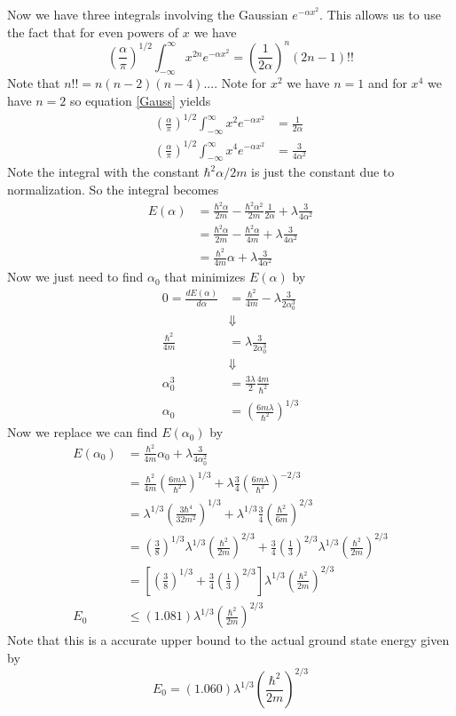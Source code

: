 \documentclass[11pt]{article}
\numberwithin{equation}{section}
\begin{document}
Now we have three integrals involving the Gaussian $e^{-\alpha x^2}$. This allows us to use the fact that for even powers of $x$ we have
\begin{equation} 
\left(\frac{\alpha}{\pi}\right)^{1/2}\int_{-\infty}^{\infty} x^{2n}e^{-\alpha x^2} = \left(\frac{1}{2\alpha}\right)^{n}(2n-1)!!
\label{Gauss}
\end{equation} 
Note that $n!! = n(n-2)(n-4)...$. Note for $x^2$ we have $n=1$ and for $x^4$ we have $n=2$ so equation \ref{Gauss} yields
\begin{align*}
\left(\frac{\alpha}{\pi}\right)^{1/2}\int_{-\infty}^{\infty} x^{2}e^{-\alpha x^2} &= \frac{1}{2\alpha}\\
\left(\frac{\alpha}{\pi}\right)^{1/2}\int_{-\infty}^{\infty} x^{4}e^{-\alpha x^2} &= \frac{3}{4\alpha^2}
\end{align*}
Note the integral with the constant $\hbar^2\alpha/2m$ is just the constant due to normalization. So the integral becomes
\begin{align*}
E(\alpha) &= \frac{\hbar^2\alpha}{2m} - \frac{\hbar^2\alpha^2}{2m}\frac{1}{2\alpha} + \lambda\frac{3}{4\alpha^2}\\
&= \frac{\hbar^2\alpha}{2m} - \frac{\hbar^2\alpha}{4m} + \lambda\frac{3}{4\alpha^2}\\
&= \frac{\hbar^2}{4m}\alpha + \lambda\frac{3}{4\alpha^2}
\end{align*}
Now we just need to find $\alpha_0$ that minimizes $E(\alpha)$ by
\begin{align*}
0 = \frac{dE(\alpha)}{d\alpha} &= \frac{\hbar^2}{4m} - \lambda\frac{3}{2\alpha_0^3}\\
&\Downarrow\\
\frac{\hbar^2}{4m} &= \lambda\frac{3}{2\alpha_0^3}\\
&\Downarrow\\
\alpha_0^3 &= \frac{3\lambda}{2}\frac{4m}{\hbar^2}\\
\alpha_0 &= \left(\frac{6m\lambda}{\hbar^2}\right)^{1/3}
\end{align*}
Now we replace we can find $E(\alpha_0)$ by
\begin{align*}
E(\alpha_0) &= \frac{\hbar^2}{4m}\alpha_0 + \lambda\frac{3}{4\alpha_0^2}\\
&= \frac{\hbar^2}{4m}\left(\frac{6m\lambda}{\hbar^2}\right)^{1/3} + \lambda\frac{3}{4}\left(\frac{6m\lambda}{\hbar^2}\right)^{-2/3}\\
&= \lambda^{1/3}\left(\frac{3\hbar^4}{32m^2}\right)^{1/3} + \lambda^{1/3}\frac{3}{4}\left(\frac{\hbar^2}{6m}\right)^{2/3}\\
&= \left(\frac{3}{8}\right)^{1/3}\lambda^{1/3}\left(\frac{\hbar^2}{2m}\right)^{2/3} + \frac{3}{4}\left(\frac{1}{3}\right)^{2/3}\lambda^{1/3}\left(\frac{\hbar^2}{2m}\right)^{2/3}\\
&= \left[\left(\frac{3}{8}\right)^{1/3} + \frac{3}{4}\left(\frac{1}{3}\right)^{2/3}\right]\lambda^{1/3}\left(\frac{\hbar^2}{2m}\right)^{2/3}\\
E_0 &\le (1.081)\lambda^{1/3}\left(\frac{\hbar^2}{2m}\right)^{2/3}
\end{align*}
Note that this is a accurate upper bound to the actual ground state energy given by
$$E_0 = (1.060)\lambda^{1/3}\left(\frac{\hbar^2}{2m}\right)^{2/3}$$
\end{document}
